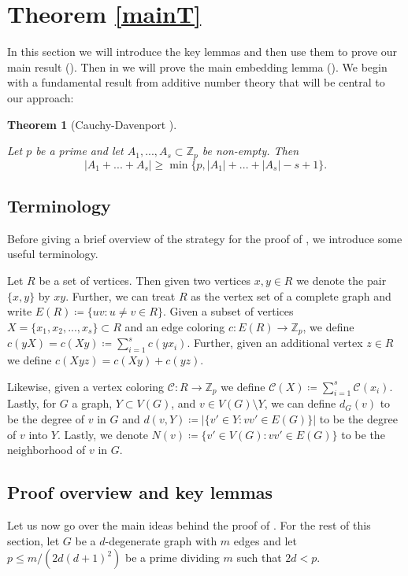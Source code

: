 \documentclass{article}
\newcommand{\cC}{\mathcal{C} }
\newtheorem{theorem}{Theorem}[section]
\theoremstyle{definition}
\begin{document}
\section{Theorem \ref{mainT}}
In this section we will introduce the key lemmas and then use them to prove our main result ().
Then in  we will prove the main embedding lemma (). We begin with a fundamental result from additive number theory that will be central to our approach:

\begin{theorem}[Cauchy-Davenport \cite{Cauchy}]\label{CD}

Let $p$ be a prime and let $A_1,...,A_s\subset \mathbb{Z}_p$ be non-empty. Then $$|A_1+...+A_s|\geq \min \{p,|A_1|+...+|A_s|-s+1\}.$$ 
    
\end{theorem}

\subsection{Terminology}
Before giving a brief overview of the strategy for the proof of , we introduce some useful terminology.

Let $R$ be a set of vertices. Then given two vertices $x,y\in R$ we denote the pair $\{x,y\}$ by $xy$. Further, we can treat $R$ as the vertex set of a complete graph and write $E(R)\coloneqq\{uv:u\neq v\in R\}$. Given a subset of vertices $X=\{x_1,x_2,...,x_s\}\subset R$ and an edge coloring $c:E(R)\to \mathbb{Z}_p$, we define $c(yX)=c(Xy)\coloneqq \sum_{i=1}^s c(yx_i)$. Further, given an additional vertex $z\in R$ we define $c(Xyz)=c(Xy)+c(yz)$. 

Likewise, given a vertex coloring $\cC:R\to \mathbb{Z}_p$ we define $\cC(X)\coloneqq \sum_{i=1}^s \cC(x_i)$. Lastly, for $G$ a graph, $Y\subset V(G)$,  and $v\in V(G)\setminus Y$, we can define $d_G(v)$ to be the degree of $v$ in $G$ and $d(v,Y)\coloneqq |\{v'\in Y:vv'\in E(G)\}|$ to be the degree of $v$ into $Y$. Lastly, we denote $N(v)\coloneqq \{v'\in V(G): vv'\in E(G)\}$ to be the neighborhood of $v$ in $G$.

\subsection{Proof overview and key lemmas}

Let us now go over the main ideas behind the proof of . For the rest of this section, let $G$ be a $d$-degenerate graph with $m$ edges and let $p\leq m/(2d(d+1)^2)$ be a prime dividing $m$ such that $2d<p$. 
\end{document}
